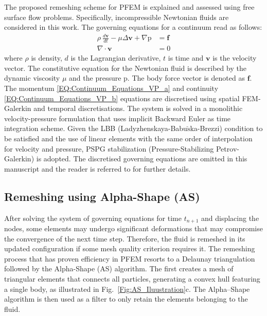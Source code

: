 \documentclass[final,3p,times]{elsarticle}
\begin{document}
The proposed remeshing scheme for PFEM is explained and assessed using free surface flow problems. Specifically, incompressible Newtonian fluids are considered in this work. The governing equations for a continuum read as follows:
%
\begin{subequations} \label{EQ:Continuum_Equations_VP}
\begin{align} 
\rho \: \frac{d \mathbf{v}}{dt} - \mu \Delta \mathbf{v}	+ \nabla \mathrm{p} & = \mathbf{f}  \label{EQ:Continuum_Equations_VP_a}
\\[1ex] 
\nabla \cdot \mathbf{v} & = 0  \label{EQ:Continuum_Equations_VP_b}
\end{align}
\end{subequations}
%
\noindent where $\rho$ is density, $d$ is the Lagrangian derivative, $t$ is time and $\mathbf{v}$ is the velocity vector. The constitutive equation for the Newtonian fluid is described by the dynamic viscosity $\mu$ and the pressure $\mathrm{p}$. The body force vector is denoted as $\mathbf{f}$. The momentum \eqref{EQ:Continuum_Equations_VP_a} and continuity \eqref{EQ:Continuum_Equations_VP_b} equations are discretised using spatial FEM-Galerkin and temporal discretisations. The system is solved in a monolithic velocity-pressure formulation that uses implicit Backward Euler as time integration scheme. Given the LBB (Ladyzhenskaya-Babu$\check{\text{s}}$ka-Brezzi) condition to be satisfied and the use of linear elements with the same order of interpolation for velocity and pressure, PSPG stabilization (Pressure-Stabilizing Petrov-Galerkin) is adopted. The discretised governing equations are omitted in this manuscript and the reader is referred to \citep{cerquaglia2019development,fernandez2022} for further details.


\subsection{Remeshing using Alpha-Shape (AS)}

After solving the system of governing equations for time $t_{n+1}$ and displacing the nodes, some elements may undergo significant deformations that may compromise the convergence of the next time step. Therefore, the fluid is remeshed in its updated configuration if some mesh quality criterion requires it. The remeshing process that has proven efficiency in PFEM resorts to a Delaunay triangulation followed by the Alpha-Shape (AS) algorithm. The first creates a mesh of triangular elements that connects all particles, generating a convex hull featuring a single body, as illustrated in Fig.~\ref{Fig:AS_Iluustration}c. The Alpha--Shape algorithm is then used as a filter to only retain the elements belonging to the fluid.
\end{document}
